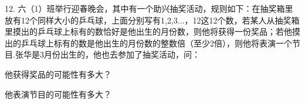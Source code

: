 12.	六（1）班举行迎春晚会，其中有一个助兴抽奖活动，规则如下：在抽奖箱里放有12个同样大小的乒乓球，上面分别写有1,2,3...，12这12个数，若某人从抽奖箱里摸出的乒乓球上标有的数恰好是他出生的月份数，则他将获得一份奖品；若他摸出的乒乓球上标有的数是他出生的月份数的整数倍（至少2倍），则他将表演一个节目.张华是3月份出生的，他也去参加了抽奖活动，问：

\begin{subquestions}

    \subquestion 他获得奖品的可能性有多大？

    \subquestion 他表演节目的可能性有多大？

\end{subquestions}





